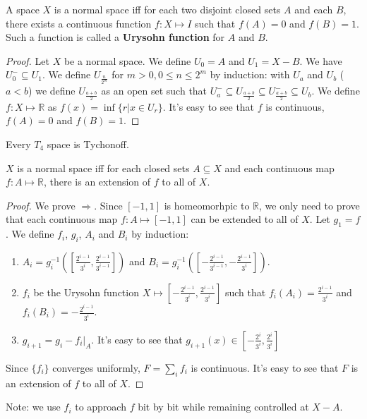 \documentclass[12pt]{book}
\begin{document}
	\begin{theorem}[Urysohn]
		A space $X$ is a normal space iff for each two disjoint closed sets $A$ and each $B$, there exists a continuous function $f:X\mapsto I$ such that $f(A)=0$ and $f(B)=1$. Such a function is called a {\bf Urysohn function} for $A$ and $B$.
	\end{theorem}
	\begin{proof}
		Let $X$ be a normal space. We define $U_0=A$ and $U_1=X-B$. We have $U^-_0\subseteq U_1$. We define $U_{\frac n {2^m}}$ for $m>0, 0\leq n\leq 2^m$ by induction: with $U_a$ and $U_b$ ($a<b$) we define $U_{\frac {a+b}2}$ as an open set such that $U_a^-\subseteq U_{\frac {a+b}2}\subseteq U_{\frac {a+b}2}^-\subseteq U_b$. We define $f: X\mapsto \mathbb R$ as $f(x)=\inf\{r|x\in U_r\}$. It's easy to see that $f$ is continuous, $f(A)=0$ and $f(B)=1$.
	\end{proof}
	\begin{corollary}
		Every $T_4$ space is Tychonoff.
	\end{corollary}
	\begin{theorem}[Tietze]
		$X$ is a normal space iff for each closed sets $A\subseteq X$ and each continuous map $f:A\mapsto \mathbb R$, there is an extension of $f$ to all of $X$.
	\end{theorem}
	\begin{proof}
		We prove $\Rightarrow$. Since $[-1,1]$ is homeomorhpic to $\mathbb R$, we only need to prove that each continuous map $f:A\mapsto [-1,1]$ can be extended to all of $X$. Let $g_1=f$. We define $f_i$, $g_i$, $A_i$ and $B_i$ by induction:
		\begin{enumerate}
			\item $A_i=g_i^{-1}([\frac {2^{i-1}}{3^i},\frac {2^{i-1}}{3^{i-1}}])$ and $B_i=g_i^{-1}([-\frac {2^{i-1}}{3^{i-1}},-\frac {2^{i-1}}{3^i}])$.
			\item $f_i$ be the Urysohn function $X\mapsto[-\frac {2^{i-1}}{3^i},\frac {2^{i-1}}{3^i}]$ such that $f_i(A_i)=\frac {2^{i-1}}{3^i}$ and $f_i(B_i)=-\frac {2^{i-1}}{3^i}$.
			\item $g_{i+1}=g_i-f_i|_A$. It's easy to see that $g_{i+1}(x)\in [-\frac {2^i}{3^i},\frac {2^i}{3^i}]$
		\end{enumerate} 
		
		Since $\{f_i\}$ converges uniformly, $F=\sum_i f_i$ is continuous. It's easy to see that $F$ is an extension of $f$ to all of $X$.
	\end{proof}
	
	Note: we use $f_i$ to approach $f$ bit by bit while remaining controlled at $X-A$.
\end{document}
